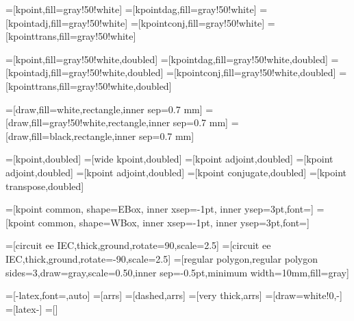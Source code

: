=[kpoint,fill=gray!50!white]
=[kpointdag,fill=gray!50!white]
=[kpointadj,fill=gray!50!white]
=[kpointconj,fill=gray!50!white]
=[kpointtrans,fill=gray!50!white]

=[kpoint,fill=gray!50!white,doubled]
=[kpointdag,fill=gray!50!white,doubled]
=[kpointadj,fill=gray!50!white,doubled]
=[kpointconj,fill=gray!50!white,doubled]
=[kpointtrans,fill=gray!50!white,doubled]

=[draw,fill=white,rectangle,inner sep=0.7 mm]
=[draw,fill=gray!50!white,rectangle,inner sep=0.7 mm]
=[draw,fill=black,rectangle,inner sep=0.7 mm]

=[kpoint,doubled]
=[wide kpoint,doubled]
=[kpoint adjoint,doubled]
=[kpoint adjoint,doubled]
=[kpoint adjoint,doubled]
=[kpoint conjugate,doubled]
=[kpoint transpose,doubled]

=[kpoint common, shape=EBox, inner xsep=-1pt, inner ysep=3pt,font=\small]
=[kpoint common, shape=WBox, inner xsep=-1pt, inner ysep=3pt,font=\small]



 =[circuit ee IEC,thick,ground,rotate=90,scale=2.5]
 =[circuit ee IEC,thick,ground,rotate=-90,scale=2.5]
 =[regular polygon,regular polygon sides=3,draw=gray,scale=0.50,inner sep=-0.5pt,minimum width=10mm,fill=gray]


=[-latex,font=\small,auto]
=[arrs]
=[dashed,arrs]
=[very thick,arrs]
=[draw=white!0,-]
=[latex-]
=[]